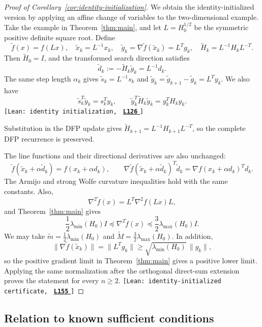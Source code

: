 \documentclass[11pt]{article}
\newcommand{\leanLinkText}[1]{%
  \underline{\textbf{#1}}%
}
\newcommand{\leanSnapshot}{e308927f5b7930bdd002f0c0e42b9d112ad821cb}
\newcommand{\leanClaimTag}[3]{%
  {\footnotesize\texttt{[Lean: #1, }}%
  \href{https://github.com/imathwy/DFP_wolfe_local/blob/\leanSnapshot/#2?plain=1\#L#3}%
    {\leanLinkText{\footnotesize\texttt{L#3}}}%
  {\footnotesize\texttt{]}}\enspace
}
\begin{document}
\begin{proof}[Proof of Corollary~\ref{cor:identity-initialization}]
We obtain the identity-initialized version by applying an affine change of
variables to the two-dimensional example.  Take the example in
Theorem~\ref{thm:main}, and let
$L=H_0^{1/2}$ be the symmetric positive definite square root.  Define
\[
\widetilde f(x)=f(Lx),\quad \widetilde x_k=L^{-1}x_k,\quad
\widetilde g_k=\nabla\widetilde f(\widetilde x_k)=L^Tg_k,\quad
\widetilde H_k=L^{-1}H_kL^{-T}.
\]
Then $\widetilde H_0=I$, and the transformed search direction satisfies
\[
\widetilde d_k:=-\widetilde H_k\widetilde g_k
=L^{-1}d_k.
\]
The same step length $\alpha_k$ gives
$\widetilde s_k=L^{-1}s_k$ and
$\widetilde y_k=\widetilde g_{k+1}-\widetilde g_k=L^Ty_k$.  We also have
\[
\widetilde s_k^T\widetilde y_k=s_k^Ty_k,
\qquad
\widetilde y_k^T\widetilde H_k\widetilde y_k=y_k^TH_ky_k.
\]
\leanClaimTag{identity initialization}{DFPWolfe/A_uniformly_convex_counterexample_to_global_convergence_of_DFP_under_weak_Wolfe_/Theorem_Main_theorem.lean}{126}
Substitution in the DFP update gives
$\widetilde H_{k+1}=L^{-1}H_{k+1}L^{-T}$, so the complete DFP recurrence is
preserved.

The line functions and their directional derivatives are also unchanged:
\[
\widetilde f(\widetilde x_k+\alpha\widetilde d_k)
=f(x_k+\alpha d_k),\qquad
\nabla\widetilde f(\widetilde x_k+\alpha\widetilde d_k)^T\widetilde d_k
=\nabla f(x_k+\alpha d_k)^Td_k.
\]
The Armijo and strong Wolfe curvature inequalities hold with the same
constants.  Also,
\[
\nabla^2\widetilde f(x)=L^T\nabla^2f(Lx)L,
\]
and Theorem~\ref{thm:main} gives
\[
\frac12\lambda_{\min}(H_0)I
\preceq\nabla^2\widetilde f(x)
\preceq\frac32\lambda_{\max}(H_0)I.
\]
We may take
$\widetilde m=\frac12\lambda_{\min}(H_0)$ and
$\widetilde M=\frac32\lambda_{\max}(H_0)$.  In addition,
\[
\|\nabla\widetilde f(\widetilde x_k)\|=\|L^Tg_k\|
\ge \sqrt{\lambda_{\min}(H_0)}\,\|g_k\|,
\]
so the positive gradient limit in Theorem~\ref{thm:main} gives a positive
lower limit.  Applying the same normalization after the orthogonal
direct-sum extension proves the statement for every $n\ge2$.
\leanClaimTag{identity-initialized certificate}{DFPWolfe/A_uniformly_convex_counterexample_to_global_convergence_of_DFP_under_weak_Wolfe_/Theorem_Main_theorem.lean}{155}
\end{proof}

\subsection{Relation to known sufficient conditions}
\label{sec:known-results}
\end{document}
